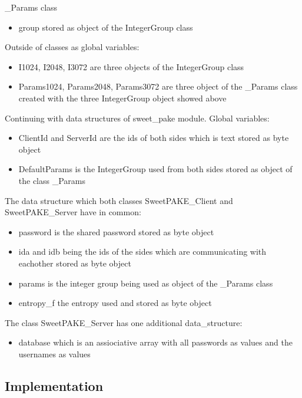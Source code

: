 \documentclass[../main.tex]{subfiles}
\begin{document}
\_Params class
\begin{itemize}
	\item group stored as object of the IntegerGroup class
\end{itemize}

Outside of classes as global variables:
\begin{itemize}
	\item I1024, I2048, I3072 are three objects of the IntegerGroup class
	\item Params1024, Params2048, Params3072 are three object of the
		\_Params class created with the three IntegerGroup object
		showed above
\end{itemize}

Continuing with data structures of sweet\_pake module. Global variables:
\begin{itemize}
	\item ClientId and ServerId are the ids of both sides which is text
	stored as byte object 
  	\item DefaultParams is the IntegerGroup used from
		both sides stored as object of the class \_Params
\end{itemize}

The data structure which both classes SweetPAKE\_Client and SweetPAKE\_Server have in common:
\begin{itemize}
	\item password is the shared password stored as byte object 
	\item ida and idb being the ids of the sides which are communicating
		with eachother stored as byte object
	\item params is the integer group being used as object of the \_Params class
	\item entropy\_f the entropy used and stored as byte object
\end{itemize}

The class SweetPAKE\_Server has one additional data\_structure:
\begin{itemize} 
 	\item database which is an assiociative array with all passwords as
			values and the usernames as values
\end{itemize}

\subsection{Implementation}
\end{document}
